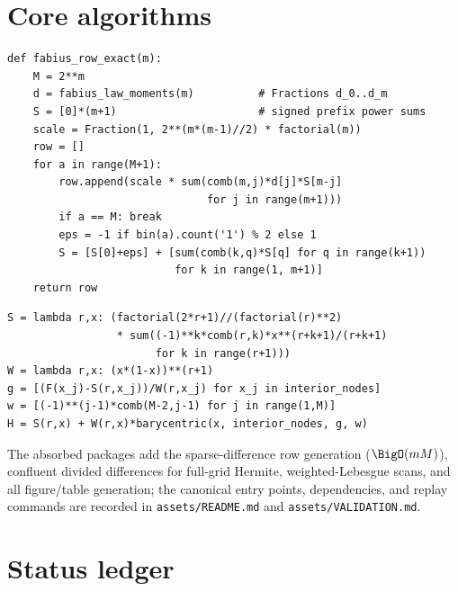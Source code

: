 \section{Core algorithms}
\label{app:algorithms}

\begin{lstlisting}[style=pythonstyle,caption={Streaming the exact
dyadic Fabius row (\cref{alg:stream}); \texttt{d} holds the exact
Fabius-law moments of \eqref{eq:d-recurrence}.}]
def fabius_row_exact(m):
    M = 2**m
    d = fabius_law_moments(m)          # Fractions d_0..d_m
    S = [0]*(m+1)                      # signed prefix power sums
    scale = Fraction(1, 2**(m*(m-1)//2) * factorial(m))
    row = []
    for a in range(M+1):
        row.append(scale * sum(comb(m,j)*d[j]*S[m-j]
                               for j in range(m+1)))
        if a == M: break
        eps = -1 if bin(a).count('1') % 2 else 1
        S = [S[0]+eps] + [sum(comb(k,q)*S[q] for q in range(k+1))
                          for k in range(1, m+1)]
    return row
\end{lstlisting}

\begin{lstlisting}[style=pythonstyle,caption={Endpoint-flat
interpolation in barycentric form (\cref{thm:factorization}).}]
S = lambda r,x: (factorial(2*r+1)//(factorial(r)**2)
                 * sum((-1)**k*comb(r,k)*x**(r+k+1)/(r+k+1)
                       for k in range(r+1)))
W = lambda r,x: (x*(1-x))**(r+1)
g = [(F(x_j)-S(r,x_j))/W(r,x_j) for x_j in interior_nodes]
w = [(-1)**(j-1)*comb(M-2,j-1) for j in range(1,M)]
H = S(r,x) + W(r,x)*barycentric(x, interior_nodes, g, w)
\end{lstlisting}

The absorbed packages add the sparse-difference row generation
($\BigO(mM)$), confluent divided differences for full-grid Hermite,
weighted-Lebesgue scans, and all figure/table generation; the canonical entry points, dependencies, and replay commands are
recorded in \nolinkurl{assets/README.md} and \nolinkurl{assets/VALIDATION.md}.


\section{Status ledger}
\label{gq:app:status-ledger}

